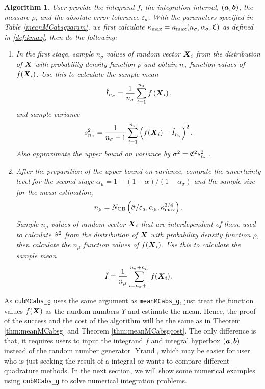 \documentclass{iitthesis}
\DeclareMathOperator{\Yrand}{Yrand}
\newtheorem{algorithm}[theorem]{Algorithm}
\theoremstyle{definition}
\begin{document}
\begin{algorithm}\label{alg:cubMCabsg} 
User provide the integrand $f$, the integration interval, $(\boldsymbol{a},\boldsymbol{b})$, the measure $\rho$, and the absolute error tolerance $\varepsilon_a$. With the parameters specified in Table \ref{meanMCabsgparam}, we first calculate $\kappa_{\max}=\kappa_{\max}(n_\sigma,\alpha_\sigma,\mathfrak{C})$ as defined in \eqref{def:kmax}, then do the following:
\begin{enumerate}
\item In the first stage, sample $n_\sigma$ values of random vector $\boldsymbol{X}_i$ from the distribution of $\boldsymbol{X}$ with probability density function $\rho$ and obtain $n_\sigma$ function values of $f(\boldsymbol{X}_i)$. Use this to calculate the sample mean $$\hat{I}_{n_\sigma} = \frac{1}{n_\sigma}\sum_{i=1}^{n_\sigma} f\left(\boldsymbol{X}_i\right),$$ and sample variance $$s_{n_\sigma}^2 = \frac{1}{n_\sigma-1}\sum_{i=1}^{n_\sigma} \left(f(\boldsymbol{X}_i)-\hat{I}_{n_\sigma}\right)^2.$$ Also approximate the upper bound on variance by $\hat{\sigma}^2 = \mathfrak{C}^2 s^2_{n_\sigma}$. 

\item After the preparation of the upper bound on variance, compute the uncertainty level for the second stage $\alpha_\mu = 1-(1-\alpha)/(1-\alpha_{\sigma})$ and the sample size for the mean estimation,
\begin{align}
n_\mu = N_{\text{CB}} \left(\hat{\sigma}/\varepsilon_a,\alpha_\mu, \kappa_{\max}^{3/4}\right).
\end{align}
Sample $n_\mu$ values of random vector $\boldsymbol{X}_i$ that are interdependent of those used to calculate $\hat{\sigma}^2$ from the distribution of $\boldsymbol{X}$ with probability density function $\rho$, then calculate the $n_\mu$ function values of $f(\boldsymbol{X}_i)$. Use this to calculate the sample mean 
\begin{align}\label{hmun}
\hat{I}= \frac{1}{n_\mu}\sum_{i = n_\sigma+1}^{n_\sigma+n_\mu}f(\boldsymbol{X}_i).
\end{align}
\end{enumerate}
\end{algorithm}
As {\tt cubMCabs\_g} uses the same argument as {\tt meanMCabs\_g}, just treat the function values $f(\boldsymbol{X}) $ as the random numbers $Y$ and estimate the mean. Hence, the proof of the success and the cost of the algorithm will be the same as in Theorem \ref{thm:meanMCabsg} and Theorem \ref{thm:meanMCabsgcost}. The only difference is that, it requires users to input the integrand $f$ and integral hyperbox $(\boldsymbol{a},\boldsymbol{b})$ instead of the random number generator $\Yrand$, which may be easier for user who is just seeking the result of a integral or wants to compare different quadrature methods. In the next section, we will show some numerical examples using {\tt cubMCabs\_g} to solve numerical integration problems.
\end{document}
